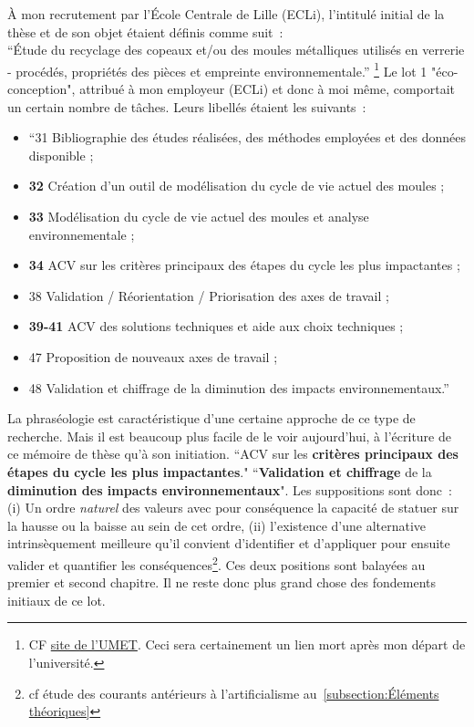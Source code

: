 À mon recrutement par l'École Centrale de Lille (ECLi), l'intitulé initial de la thèse et de son objet étaient définis comme suit~:\\
``Étude du recyclage des copeaux et/ou des moules métalliques utilisés en verrerie - procédés, propriétés des pièces et empreinte environnementale.''
\footnote{
CF \href{http://umet.univ-lille1.fr/details.php?show=370&lang=fr}{site de l'UMET}. Ceci sera certainement un lien mort après mon départ de l'université.
}
Le lot 1 "éco-conception", attribué à mon employeur (ECLi) et donc à moi même, comportait un certain nombre de tâches.
Leurs libellés étaient les suivants~:
\begin{itemize}[noitemsep]
\item ``31 Bibliographie des études réalisées, des méthodes employées et des données disponible ;
\item  \textbf{32} Création d'un outil de modélisation du cycle de vie actuel des moules ;
\item  \textbf{33} Modélisation du cycle de vie actuel des moules et analyse environnementale ;
\item  \textbf{34} ACV sur les critères principaux des étapes du cycle les plus impactantes ;
\item  38 Validation / Réorientation / Priorisation des axes de travail ;
\item  \textbf{39-41} ACV des solutions techniques et aide aux choix techniques ;
\item 47 Proposition de nouveaux axes de travail ;
\item 48 Validation et chiffrage de la diminution des impacts environnementaux.''
\end{itemize}

La phraséologie est caractéristique d'une certaine approche de ce type de recherche.
Mais il est beaucoup plus facile de le voir aujourd'hui, à l'écriture de ce mémoire de thèse qu'à son initiation.
``ACV sur les \textbf{critères principaux des étapes du cycle les plus impactantes}."
``\textbf{Validation et chiffrage} de la \textbf{diminution des impacts environnementaux}".
Les suppositions sont donc~:
(i) Un ordre \textit{naturel} des valeurs avec pour conséquence la capacité de statuer sur la hausse ou la baisse au sein de cet ordre, (ii) l'existence d'une alternative intrinsèquement meilleure qu'il convient d'identifier et d'appliquer pour ensuite valider et quantifier les conséquences\footnote{cf étude des courants antérieurs à l'artificialisme au~\ref{subsection:Éléments théoriques}}.
Ces deux positions sont balayées au premier et second chapitre.
Il ne reste donc plus grand chose des fondements initiaux de ce lot.

